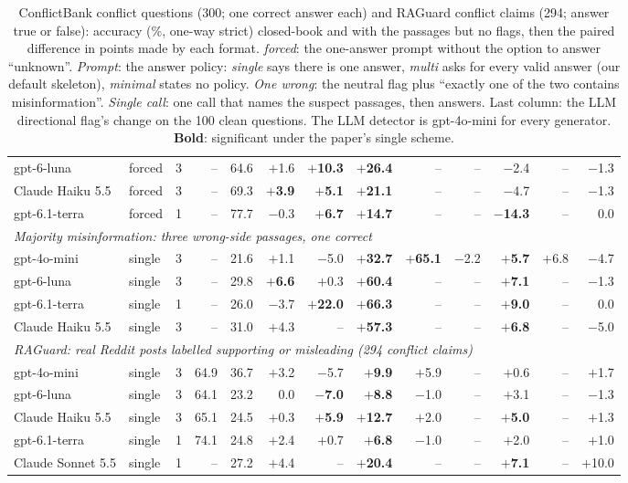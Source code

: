 \begin{table}[t]
{\begin{tabular}{llrrrrrrrrrrr}
gpt-6-luna & forced & 3 & -- & 64.6 & $+$1.6 & \textbf{$+$10.3} & \textbf{$+$26.4} & -- & -- & $-$2.4 & -- & $-$1.3 \\
Claude Haiku 5.5 & forced & 3 & -- & 69.3 & \textbf{$+$3.9} & \textbf{$+$5.1} & \textbf{$+$21.1} & -- & -- & $-$4.7 & -- & $-$1.3 \\
gpt-6.1-terra & forced & 1 & -- & 77.7 & $-$0.3 & \textbf{$+$6.7} & \textbf{$+$14.7} & -- & -- & \textbf{$-$14.3} & -- & 0.0 \\
\midrule
\multicolumn{13}{l}{\emph{Majority misinformation: three wrong-side passages, one correct}} \\
gpt-4o-mini & single & 3 & -- & 21.6 & $+$1.1 & $-$5.0 & \textbf{$+$32.7} & \textbf{$+$65.1} & $-$2.2 & \textbf{$+$5.7} & $+$6.8 & $-$4.7 \\
gpt-6-luna & single & 3 & -- & 29.8 & \textbf{$+$6.6} & $+$0.3 & \textbf{$+$60.4} & -- & -- & \textbf{$+$7.1} & -- & $-$1.3 \\
gpt-6.1-terra & single & 1 & -- & 26.0 & $-$3.7 & \textbf{$+$22.0} & \textbf{$+$66.3} & -- & -- & \textbf{$+$9.0} & -- & 0.0 \\
Claude Haiku 5.5 & single & 3 & -- & 31.0 & $+$4.3 & -- & \textbf{$+$57.3} & -- & -- & \textbf{$+$6.8} & -- & $-$5.0 \\
\midrule
\multicolumn{13}{l}{\emph{RAGuard: real Reddit posts labelled supporting or misleading (294 conflict claims)}} \\
gpt-4o-mini & single & 3 & 64.9 & 36.7 & $+$3.2 & $-$5.7 & \textbf{$+$9.9} & $+$5.9 & -- & $+$0.6 & -- & $+$1.7 \\
gpt-6-luna & single & 3 & 64.1 & 23.2 & 0.0 & \textbf{$-$7.0} & \textbf{$+$8.8} & $-$1.0 & -- & $+$3.1 & -- & $-$1.3 \\
Claude Haiku 5.5 & single & 3 & 65.1 & 24.5 & $+$0.3 & \textbf{$+$5.9} & \textbf{$+$12.7} & $+$2.0 & -- & \textbf{$+$5.0} & -- & $+$1.3 \\
gpt-6.1-terra & single & 1 & 74.1 & 24.8 & $+$2.4 & $+$0.7 & \textbf{$+$6.8} & $-$1.0 & -- & $+$2.0 & -- & $+$1.0 \\
Claude Sonnet 5.5 & single & 1 & -- & 27.2 & $+$4.4 & -- & \textbf{$+$20.4} & -- & -- & \textbf{$+$7.1} & -- & $+$10.0 \\
\bottomrule
\end{tabular}}
\caption{ConflictBank conflict questions (300; one correct answer each) and RAGuard conflict claims (294; answer true
or false): accuracy (\%, one-way strict) closed-book and with the passages but no flags, then the paired difference
in points made by each format. \emph{forced}: the one-answer prompt without the option to answer ``unknown''. \emph{Prompt}: the
answer policy: \emph{single} says there is one answer, \emph{multi} asks for every valid answer (our default
skeleton), \emph{minimal} states no policy. \emph{One wrong}: the neutral flag plus ``exactly one of the two
contains misinformation''. \emph{Single call}: one call that names the suspect passages, then answers. Last column:
the LLM directional flag's change on the 100 clean questions. The LLM detector is gpt-4o-mini for every generator.
\textbf{Bold}: significant under the paper's single scheme.}
\label{tab:cb}
\end{table}
